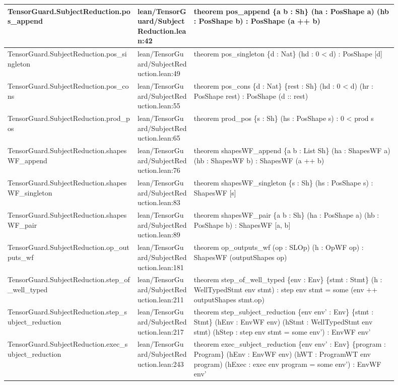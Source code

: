 \documentclass[10pt]{article}
\begin{document}
\begin{longtable}{|p{0.30\linewidth}|p{0.13\linewidth}|p{0.47\linewidth}|}
\hline
TensorGuard.SubjectReduction.pos\_append & lean/TensorGuard/SubjectReduction.lean:42 & theorem pos\_append \{a b : Sh\} (ha : PosShape a) (hb : PosShape b) : PosShape (a ++ b) \\
\hline
TensorGuard.SubjectReduction.pos\_singleton & lean/TensorGuard/SubjectReduction.lean:49 & theorem pos\_singleton \{d : Nat\} (hd : 0 < d) : PosShape [d] \\
\hline
TensorGuard.SubjectReduction.pos\_cons & lean/TensorGuard/SubjectReduction.lean:55 & theorem pos\_cons \{d : Nat\} \{rest : Sh\} (hd : 0 < d) (hr : PosShape rest) : PosShape (d :: rest) \\
\hline
TensorGuard.SubjectReduction.prod\_pos & lean/TensorGuard/SubjectReduction.lean:65 & theorem prod\_pos \{s : Sh\} (hs : PosShape s) : 0 < prod s \\
\hline
TensorGuard.SubjectReduction.shapesWF\_append & lean/TensorGuard/SubjectReduction.lean:76 & theorem shapesWF\_append \{a b : List Sh\} (ha : ShapesWF a) (hb : ShapesWF b) : ShapesWF (a ++ b) \\
\hline
TensorGuard.SubjectReduction.shapesWF\_singleton & lean/TensorGuard/SubjectReduction.lean:83 & theorem shapesWF\_singleton \{s : Sh\} (hs : PosShape s) : ShapesWF [s] \\
\hline
TensorGuard.SubjectReduction.shapesWF\_pair & lean/TensorGuard/SubjectReduction.lean:89 & theorem shapesWF\_pair \{a b : Sh\} (ha : PosShape a) (hb : PosShape b) : ShapesWF [a, b] \\
\hline
TensorGuard.SubjectReduction.op\_outputs\_wf & lean/TensorGuard/SubjectReduction.lean:181 & theorem op\_outputs\_wf (op : SLOp) (h : OpWF op) : ShapesWF (outputShapes op) \\
\hline
TensorGuard.SubjectReduction.step\_of\_well\_typed & lean/TensorGuard/SubjectReduction.lean:211 & theorem step\_of\_well\_typed \{env : Env\} \{stmt : Stmt\} (h : WellTypedStmt env stmt) : step env stmt = some (env ++ outputShapes stmt.op) \\
\hline
TensorGuard.SubjectReduction.step\_subject\_reduction & lean/TensorGuard/SubjectReduction.lean:217 & theorem step\_subject\_reduction \{env env' : Env\} \{stmt : Stmt\} (hEnv : EnvWF env) (hStmt : WellTypedStmt env stmt) (hStep : step env stmt = some env') : EnvWF env' \\
\hline
TensorGuard.SubjectReduction.exec\_subject\_reduction & lean/TensorGuard/SubjectReduction.lean:243 & theorem exec\_subject\_reduction \{env env' : Env\} \{program : Program\} (hEnv : EnvWF env) (hWT : ProgramWT env program) (hExec : exec env program = some env') : EnvWF env' \\

\end{longtable}
\end{document}
